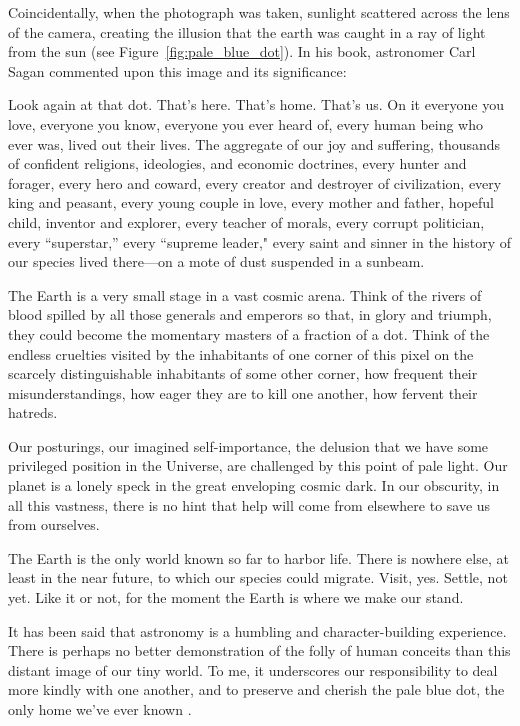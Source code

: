     Coincidentally, when the photograph was taken, sunlight scattered across the lens of the camera, creating the illusion that the earth was caught in a ray of light from the sun (see  Figure~\ref{fig:pale_blue_dot}). In his book, astronomer Carl Sagan commented upon this image and its significance:
    \begin{displayquote}
        \small %
        \quad Look again at that dot. That's here. That's home. That's us. On it everyone you love, everyone you know, everyone you ever heard of, every human being who ever was, lived out their lives. The aggregate of our joy and suffering, thousands of confident religions, ideologies, and economic doctrines, every hunter and forager, every hero and coward, every creator and destroyer of civilization, every king and peasant, every young couple in love, every mother and father, hopeful child, inventor and explorer, every teacher of morals, every corrupt politician, every ``superstar,'' every ``supreme leader," every saint and sinner in the history of our species lived there---on a mote of dust suspended in a sunbeam.

        \quad The Earth is a very small stage in a vast cosmic arena. Think of the rivers of blood spilled by all those generals and emperors so that, in glory and triumph, they could become the momentary masters of a fraction of a dot. Think of the endless cruelties visited by the inhabitants of one corner of this pixel on the scarcely distinguishable inhabitants of some other corner, how frequent their misunderstandings, how eager they are to kill one another, how fervent their hatreds.

        \quad Our posturings, our imagined self-importance, the delusion that we have some privileged position in the Universe, are challenged by this point of pale light. Our planet is a lonely speck in the great enveloping cosmic dark. In our obscurity, in all this vastness, there is no hint that help will come from elsewhere to save us from ourselves.

        \quad The Earth is the only world known so far to harbor life. There is nowhere else, at least in the near future, to which our species could migrate. Visit, yes. Settle, not yet. Like it or not, for the moment the Earth is where we make our stand.

        \quad It has been said that astronomy is a humbling and character-building experience. There is perhaps no better demonstration of the folly of human conceits than this distant image of our tiny world. To me, it underscores our responsibility to deal more kindly with one another, and to preserve and cherish the pale blue dot, the only home we've ever known \cite{sagan}.
    \end{displayquote}

